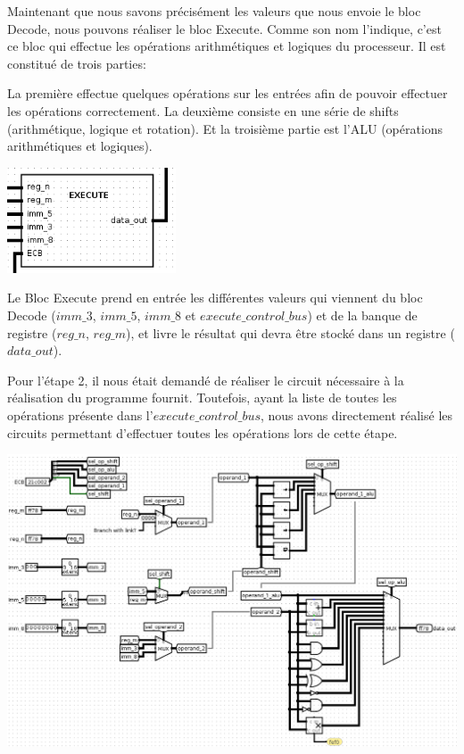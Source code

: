 \documentclass[11pt,a4paper]{article}
\begin{document}
Maintenant que nous savons précisément les valeurs que nous envoie le bloc Decode, nous pouvons réaliser le bloc Execute. Comme son nom l'indique, c'est ce bloc qui effectue les opérations arithmétiques et logiques du processeur. Il est constitué de trois parties: 

La première effectue quelques opérations sur les entrées afin de pouvoir effectuer les opérations correctement. La deuxième consiste en une série de shifts (arithmétique, logique et rotation). Et la troisième partie est l'ALU (opérations arithmétiques et logiques).

\begin{center}
\includegraphics[width=5cm]{img_bloc_execute.png}
\end{center}

Le Bloc Execute prend en entrée les différentes valeurs qui viennent du bloc Decode ($imm\_3$, $imm\_5$, $imm\_8$ et $execute\_control\_bus$) et de la banque de registre ($reg\_n$, $reg\_m$), et livre le résultat qui devra être stocké dans un registre ($data\_out$).

Pour l'étape 2, il nous était demandé de réaliser le circuit nécessaire à la réalisation du programme fournit. Toutefois, ayant la liste de toutes les opérations présente dans l'$execute\_control\_bus$, nous avons directement réalisé les circuits permettant d'effectuer toutes les opérations lors de cette étape.

\includegraphics[width=15.3cm]{img_execute.png}
\end{document}
